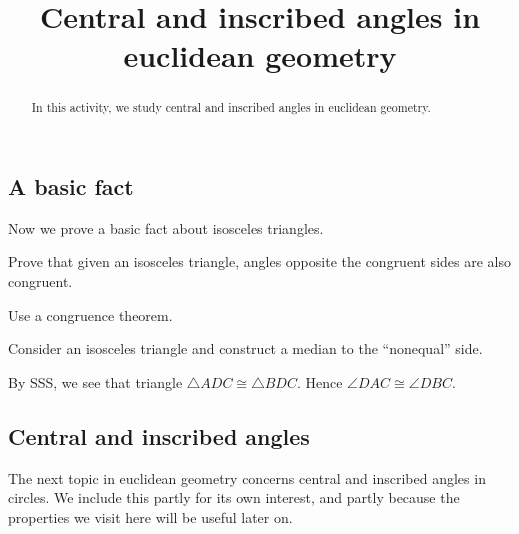 \documentclass[newpage,hints,handout,noauthor,nooutcomes,12pt]{ximera}
\title{Central and inscribed angles in euclidean geometry}
\begin{document}
\begin{abstract}
In this activity, we study central and inscribed angles in euclidean
geometry.
\end{abstract}
\maketitle

\subsection{A basic fact}
Now we prove a basic fact about isosceles triangles.


\begin{problem}
Prove that given an isosceles triangle, angles opposite the congruent
sides are also congruent.
\begin{hint}
Use a congruence theorem.
\end{hint}
\begin{freeResponse}
Consider an isosceles triangle and construct a median to the
``nonequal'' side.
\begin{center}
\end{center}
By SSS, we see that triangle $\triangle ADC \cong \triangle
BDC$. Hence $\angle DAC \cong \angle DBC$.
\end{freeResponse}
\end{problem}


\subsection{Central and inscribed angles}

The next topic in euclidean geometry concerns central and inscribed
angles in circles. We include this partly for its own interest, and
partly because the properties we visit here will be useful later on.
\end{document}

